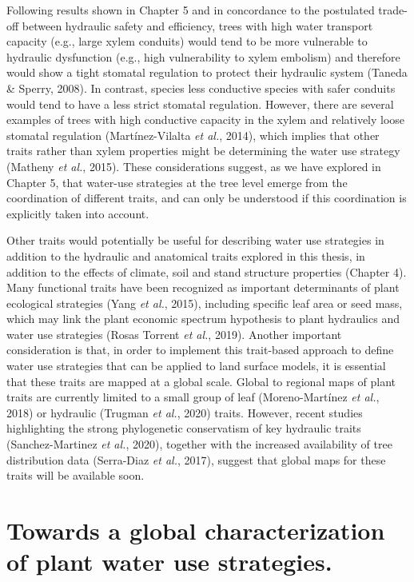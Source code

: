 \documentclass[11pt,twoside]{reedthesis}
\begin{document}
Following results shown in Chapter 5 and in concordance to the
postulated trade-off between hydraulic safety and efficiency, trees with
high water transport capacity (e.g., large xylem conduits) would tend to
be more vulnerable to hydraulic dysfunction (e.g., high vulnerability to
xylem embolism) and therefore would show a tight stomatal regulation to
protect their hydraulic system (Taneda \& Sperry, 2008). In contrast,
species less conductive species with safer conduits would tend to have a
less strict stomatal regulation. However, there are several examples of
trees with high conductive capacity in the xylem and relatively loose
stomatal regulation (Martínez-Vilalta \emph{et al.}, 2014), which
implies that other traits rather than xylem properties might be
determining the water use strategy (Matheny \emph{et al.}, 2015). These
considerations suggest, as we have explored in Chapter 5, that water-use
strategies at the tree level emerge from the coordination of different
traits, and can only be understood if this coordination is explicitly
taken into account.\par

Other traits would potentially be useful for describing water use
strategies in addition to the hydraulic and anatomical traits explored
in this thesis, in addition to the effects of climate, soil and stand
structure properties (Chapter 4). Many functional traits have been
recognized as important determinants of plant ecological strategies
(Yang \emph{et al.}, 2015), including specific leaf area or seed mass,
which may link the plant economic spectrum hypothesis to plant
hydraulics and water use strategies (Rosas Torrent \emph{et al.}, 2019).
Another important consideration is that, in order to implement this
trait-based approach to define water use strategies that can be applied
to land surface models, it is essential that these traits are mapped at
a global scale. Global to regional maps of plant traits are currently
limited to a small group of leaf (Moreno-Martínez \emph{et al.}, 2018)
or hydraulic (Trugman \emph{et al.}, 2020) traits. However, recent
studies highlighting the strong phylogenetic conservatism of key
hydraulic traits (Sanchez-Martinez \emph{et al.}, 2020), together with
the increased availability of tree distribution data (Serra-Diaz
\emph{et al.}, 2017), suggest that global maps for these traits will be
available soon.\par

\section{Towards a global characterization of plant water use
strategies.}\label{towards-a-global-characterization-of-plant-water-use-strategies.}
\end{document}

